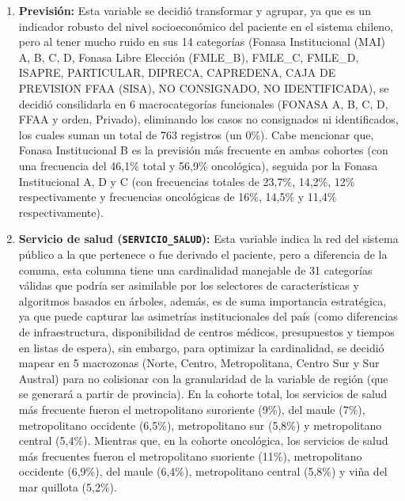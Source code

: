 \begin{enumerate}
    \item \textbf{Previsión:} Esta variable se decidió transformar y agrupar, ya que es un indicador robusto del nivel socioeconómico del paciente en el sistema chileno, pero al tener mucho ruido en sus 14 categorías (Fonasa Institucional (MAI) A, B, C, D, Fonasa Libre Elección (FMLE\_B), FMLE\_C, FMLE\_D, ISAPRE, PARTICULAR, DIPRECA, CAPREDENA, CAJA DE PREVISION FFAA (SISA), NO CONSIGNADO, NO IDENTIFICADA), se decidió consilidarla en 6 macrocategorías funcionales (FONASA A, B, C, D, FFAA y orden, Privado), eliminando los casos no consignados ni identificados, los cuales suman un total de 763 registros (un 0\%). Cabe mencionar que, Fonasa Institucional B es la previsión más frecuente en ambas cohortes (con una frecuencia del 46,1\% total y 56,9\% oncológica), seguida por la Fonasa Institucional A, D y C (con frecuencias totales de 23,7\%, 14,2\%, 12\% respectivamente y frecuencias oncológicas de 16\%, 14,5\% y 11,4\% respectivamente).
    \item \textbf{Servicio de salud (\texttt{SERVICIO\_SALUD}):} Esta variable indica la red del sistema público a la que pertenece o fue derivado el paciente, pero a diferencia de la comuna, esta columna tiene una cardinalidad manejable de 31 categorías válidas que podría ser asimilable por los selectores de características y algoritmos basados en árboles, además, es de suma importancia estratégica, ya que puede capturar las asimetrías institucionales del país (como diferencias de infraestructura, disponibilidad de centros médicos, presupuestos y tiempos en listas de espera), sin embargo, para optimizar la cardinalidad, se decidió mapear en 5 macrozonas (Norte, Centro, Metropolitana, Centro Sur y Sur Austral) para no colisionar con la granularidad de la variable de región (que se generará a partir de provincia). En la cohorte total, los servicios de salud más frecuente fueron el metropolitano suroriente (9\%), del maule (7\%), metropolitano occidente (6,5\%), metropolitano sur (5,8\%) y metropolitano central (5,4\%). Mientras que, en la cohorte oncológica, los servicios de salud más frecuentes fueron el metropolitano suoriente (11\%), metropolitano occidente (6,9\%), del maule (6,4\%), metropolitano central (5,8\%) y viña del mar quillota (5,2\%).

\end{enumerate}
